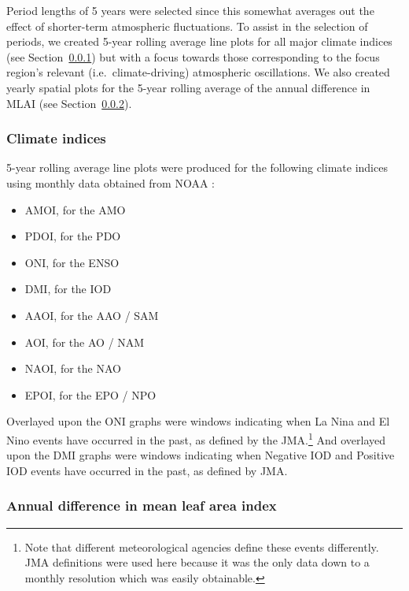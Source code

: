 Period lengths of 5 years were selected since this somewhat averages out the effect of shorter-term atmospheric fluctuations. To assist in the selection of periods, we created 5-year rolling average line plots for all major climate indices (see Section~\ref{ssec:indices}) but with a focus towards those corresponding to the focus region's relevant (i.e.\ climate-driving) atmospheric oscillations. We also created yearly spatial plots for the 5-year rolling average of the annual difference in \ac{MLAI} (see Section~\ref{ssec:mlai_diff}).

\subsubsection{Climate indices}
\label{ssec:indices}

5-year rolling average line plots were produced for the following climate indices using monthly data obtained from \ac{NOAA} \citep{ind_source}:
\begin{itemize}
	\item \ac{AMOI}, for the \ac{AMO}
	\item \ac{PDOI}, for the \ac{PDO}
	\item \ac{ONI}, for the \ac{ENSO}
	\item \ac{DMI}, for the \ac{IOD}
	\item \ac{AAOI}, for the \ac{AAO} / \ac{SAM}
	\item \ac{AOI}, for the \ac{AO} / \ac{NAM}
	\item \ac{NAOI}, for the \ac{NAO}
	\item \ac{EPOI}, for the \ac{EPO} / \ac{NPO}
\end{itemize}

Overlayed upon the \ac{ONI} graphs were windows indicating when La Nina and El Nino events have occurred in the past, as defined by the \ac{JMA}.\footnote{Note that different meteorological agencies define these events differently. \ac{JMA} definitions were used here because it was the only data down to a monthly resolution which was easily obtainable.} And overlayed upon the \ac{DMI} graphs were windows indicating when Negative \ac{IOD} and Positive \ac{IOD} events have occurred in the past, as defined by \ac{JMA}.

\subsubsection{Annual difference in mean leaf area index}
\label{ssec:mlai_diff}


